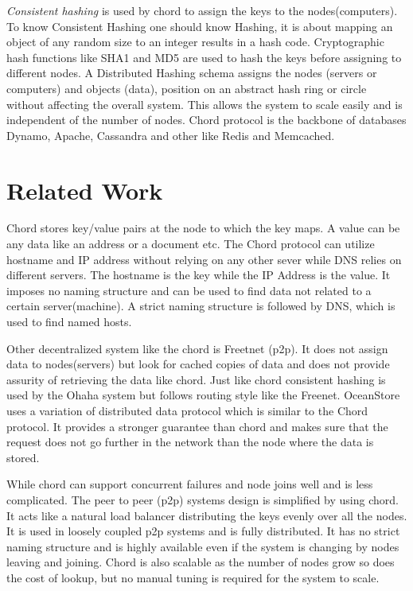 \documentclass[a4paper]{article}
\begin{document}
\textit{Consistent hashing} is used by chord to assign the keys to the nodes(computers). To know Consistent Hashing one should know Hashing, it is about mapping an object of any random size to an integer results in a hash code. Cryptographic hash functions like SHA1 and MD5 are used to hash the keys before assigning to different nodes. A Distributed Hashing schema assigns the nodes (servers or computers) and objects (data), position on an abstract hash ring or circle without affecting the overall system. This allows the system to scale easily and is independent of the number of nodes. Chord protocol is the backbone of databases Dynamo, Apache, Cassandra and other like Redis and Memcached.

\section{Related Work}

Chord stores key/value pairs at the node to which the key maps. A value can be any data like an address or a document etc. The Chord protocol can utilize hostname and IP address without relying on any other sever while DNS relies on different servers. The hostname is the key while the IP Address is the value. It imposes no naming structure and can be used to find data not related to a certain server(machine). A strict naming structure is followed by DNS, which is used to find named hosts. 

Other decentralized system like the chord is Freetnet (p2p). It does not assign data to nodes(servers) but look for cached copies of data and does not provide assurity of retrieving the data like chord. Just like chord consistent hashing is used by the Ohaha system but follows routing style like the Freenet. OceanStore uses a variation of distributed data protocol which is similar to the Chord protocol. It provides a stronger guarantee than chord and makes sure that the request does not go further in the network than the node where the data is stored. 

While chord can support concurrent failures and node joins well and is less complicated. The peer to peer (p2p) systems design is simplified by using chord. It acts like a natural load balancer distributing the keys evenly over all the nodes. It is used in loosely coupled p2p systems and is fully distributed. It has no strict naming structure and is highly available even if the system is changing by nodes leaving and joining. Chord is also scalable as the number of nodes grow so does the cost of lookup, but no manual tuning is required for the system to scale. 
\end{document}
